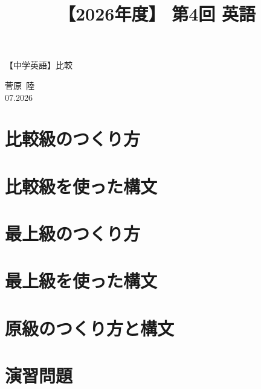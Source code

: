 \documentclass[12pt,a4paper]{jsarticle}
\title{【2026年度】 第4回 英語}                %
\author{}                     %
\date{}                       %
\begin{document}
\vspace{-3.5em}
\begin{center}
{\LARGE 【中学英語】比較}
\end{center}
\vspace{-1.5em}

\begin{flushright}
  菅原\ 陸\\
  07.2026
\end{flushright}
\vspace{-3.5em}


\section{比較級のつくり方}\vspace{-0.4em}



\section{比較級を使った構文}\vspace{-0.5em}



\section{最上級のつくり方}\vspace{-0.5em}



\section{最上級を使った構文}\vspace{-0.5em}



\section{原級のつくり方と構文}\vspace{-0.5em}



\section{演習問題}\vspace{-0.5em}


\end{document}
